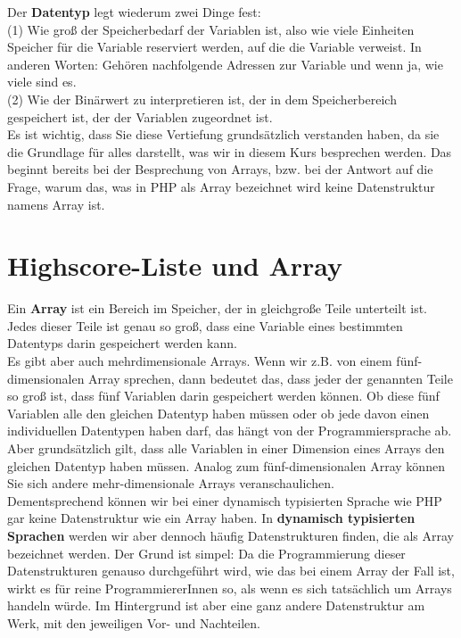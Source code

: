 Der \textbf{Datentyp} legt wiederum zwei Dinge fest:\\

(1) Wie groß der Speicherbedarf der Variablen ist, also wie viele Einheiten Speicher für die Variable reserviert werden, auf die die Variable verweist. In anderen Worten: Gehören nachfolgende Adressen zur Variable und wenn ja, wie viele sind es.\\

(2) Wie der Binärwert zu interpretieren ist, der in dem Speicherbereich gespeichert ist, der der Variablen zugeordnet ist.\\

Es ist wichtig, dass Sie diese Vertiefung grundsätzlich verstanden haben, da sie die Grundlage für alles darstellt, was wir in diesem Kurs besprechen werden. Das beginnt bereits bei der Besprechung von Arrays, bzw. bei der Antwort auf die Frage, warum das, was in PHP als Array bezeichnet wird keine Datenstruktur namens Array ist.

\section{Highscore-Liste und Array}

Ein \textbf{Array} ist ein Bereich im Speicher, der in gleichgroße Teile unterteilt ist. Jedes dieser Teile ist genau so groß, dass eine Variable eines bestimmten Datentyps darin gespeichert werden kann.\\

Es gibt aber auch mehrdimensionale Arrays. Wenn wir z.B. von einem fünf-dimensionalen Array sprechen, dann bedeutet das, dass jeder der genannten Teile so groß ist, dass fünf Variablen darin gespeichert werden können. Ob diese fünf Variablen alle den gleichen Datentyp haben müssen oder ob jede davon einen individuellen Datentypen haben darf, das hängt von der Programmiersprache ab. Aber grundsätzlich gilt, dass alle Variablen in einer Dimension eines Arrays den gleichen Datentyp haben müssen. Analog zum fünf-dimensionalen Array können Sie sich andere mehr-dimensionale Arrays veranschaulichen.\\

Dementsprechend können wir bei einer dynamisch typisierten Sprache wie PHP gar keine Datenstruktur wie ein Array haben. In \textbf{dynamisch typisierten Sprachen} werden wir aber dennoch häufig Datenstrukturen finden, die als Array bezeichnet werden. Der Grund ist simpel: Da die Programmierung dieser Datenstrukturen genauso durchgeführt wird, wie das bei einem Array der Fall ist, wirkt es für reine ProgrammiererInnen so, als wenn es sich tatsächlich um Arrays handeln würde. Im Hintergrund ist aber eine ganz andere Datenstruktur am Werk, mit den jeweiligen Vor- und Nachteilen.\\

